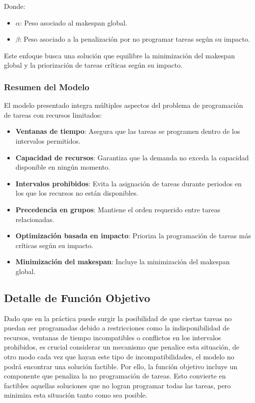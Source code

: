 \documentclass{article}
\begin{document}
Donde:

\begin{itemize}
    \item \( \alpha \): Peso asociado al makespan global.
    \item \( \beta \): Peso asociado a la penalización por no programar tareas según su impacto.
\end{itemize}

Este enfoque busca una solución que equilibre la minimización del makespan global y la priorización de tareas críticas según su impacto.

\vspace{0.5cm}

\subsubsection{Resumen del Modelo}

El modelo presentado integra múltiples aspectos del problema de programación de tareas con recursos limitados:

\begin{itemize}
    \item \textbf{Ventanas de tiempo}: Asegura que las tareas se programen dentro de los intervalos permitidos.
    \item \textbf{Capacidad de recursos}: Garantiza que la demanda no exceda la capacidad disponible en ningún momento.
    \item \textbf{Intervalos prohibidos}: Evita la asignación de tareas durante periodos en los que los recursos no están disponibles.
    \item \textbf{Precedencia en grupos}: Mantiene el orden requerido entre tareas relacionadas.
    \item \textbf{Optimización basada en impacto}: Prioriza la programación de tareas más críticas según su impacto.
    \item \textbf{Minimización del makespan}: Incluye la minimización del makespan global.
\end{itemize}



\subsection{Detalle de Función Objetivo}

Dado que en la práctica puede surgir la posibilidad de que ciertas tareas no puedan ser programadas debido a restricciones como la indisponibilidad de recursos, ventanas de tiempo incompatibles o conflictos en los intervalos prohibidos, es crucial considerar un mecanismo que penalice esta situación, de otro modo cada vez que hayan este tipo de incompatibilidades, el modelo no podrá encontrar una solución factible. Por ello, la función objetivo incluye un componente que penaliza la no programación de tareas. Esto convierte en factibles aquellas soluciones que no logran programar todas las tareas, pero minimiza esta situación tanto como sea posible.
\end{document}
